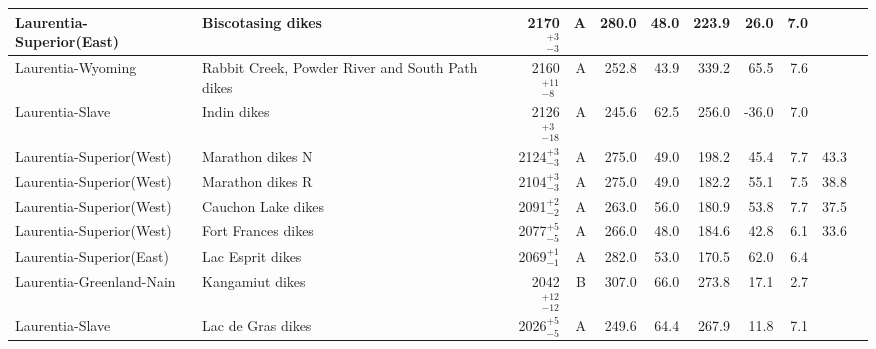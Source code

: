 \begin{ThreePartTable}
\begin{longtable}{p{1.4 in}p{1.2 in}rrrrrrrrp{1.2 in}}
      Laurentia-Superior(East) &                                  Biscotasing dikes &     2170$^{+3}_{-3}$ &      A &     280.0 &      48.0 & 223.9 &  26.0 &       7.0 &          &                                  \cite{Evans2010a} \\ \hline
             Laurentia-Wyoming &    Rabbit Creek, Powder River and South Path dikes &    2160$^{+11}_{-8}$ &      A &     252.8 &      43.9 & 339.2 &  65.5 &       7.6 &          &                                 \cite{Kilian2015a} \\ \hline
               Laurentia-Slave &                                        Indin dikes &    2126$^{+3}_{-18}$ &      A &     245.6 &      62.5 & 256.0 & -36.0 &       7.0 &          &                                 \cite{Buchan2016a} \\ \hline
      Laurentia-Superior(West) &                                   Marathon dikes N &     2124$^{+3}_{-3}$ &      A &     275.0 &      49.0 & 198.2 &  45.4 &       7.7 &        43.3 &                                  \cite{Halls2008a} \\ \hline
      Laurentia-Superior(West) &                                   Marathon dikes R &     2104$^{+3}_{-3}$ &      A &     275.0 &      49.0 & 182.2 &  55.1 &       7.5 &        38.8 &                                  \cite{Halls2008a} \\ \hline
      Laurentia-Superior(West) &                                 Cauchon Lake dikes &     2091$^{+2}_{-2}$ &      A &     263.0 &      56.0 & 180.9 &  53.8 &       7.7 &        37.5 &                                  \cite{Evans2010a} \\ \hline
      Laurentia-Superior(West) &                                 Fort Frances dikes &     2077$^{+5}_{-5}$ &      A &     266.0 &      48.0 & 184.6 &  42.8 &       6.1 &        33.6 &                                  \cite{Evans2010a} \\ \hline
      Laurentia-Superior(East) &                                   Lac Esprit dikes &     2069$^{+1}_{-1}$ &      A &     282.0 &      53.0 & 170.5 &  62.0 &       6.4 &          &                                  \cite{Evans2010a} \\ \hline
      Laurentia-Greenland-Nain &                                    Kangamiut dikes &   2042$^{+12}_{-12}$ &      B &     307.0 &      66.0 & 273.8 &  17.1 &       2.7 &         &                                 \cite{Fahrig1976b} \\ \hline
               Laurentia-Slave &                                  Lac de Gras dikes &     2026$^{+5}_{-5}$ &      A &     249.6 &      64.4 & 267.9 &  11.8 &       7.1 &          &                                 \cite{Buchan2009a} \\ \hline

\end{longtable}
\end{ThreePartTable}
